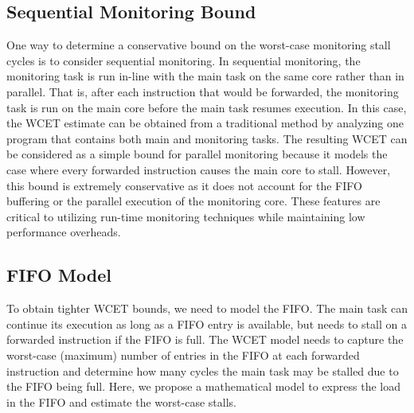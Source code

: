 \subsection{Sequential Monitoring Bound}
\label{sec:monitoring_wcet.wcet.sequential}

One way to determine a conservative bound on the worst-case monitoring stall
cycles is to consider sequential monitoring.  In sequential monitoring, the
monitoring task is run in-line with the main task on the same core rather than
in parallel. That is, after each instruction that would be forwarded, the
monitoring task is run on the main core before the main task resumes execution.
In this case, the WCET estimate can be obtained from a traditional method by
analyzing one program that contains both main and monitoring tasks.  The
resulting WCET can be considered as a simple bound for parallel monitoring
because it models the case where every forwarded instruction causes the main
core to stall.  However, this bound is extremely conservative as it does not
account for the FIFO buffering or the parallel execution of the monitoring
core. These features are critical to utilizing run-time monitoring techniques
while maintaining low performance overheads.

\subsection{FIFO Model}
\label{sec:monitoring_wcet.wcet.model}

To obtain tighter WCET bounds, we need to model the FIFO.  The main task can
continue its execution as long as a FIFO entry is available, but needs to stall
on a forwarded instruction if the FIFO is full. The WCET model needs to capture
the worst-case (maximum) number of entries in the FIFO at each forwarded
instruction and determine how many cycles the main task may be stalled due to
the FIFO being full. Here, we propose a mathematical model to express the load
in the FIFO and estimate the worst-case stalls.

